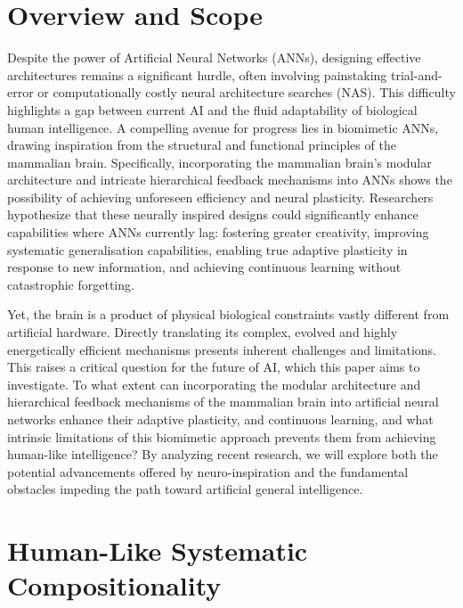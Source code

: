 \documentclass[
10pt, %
a4paper, %
oneside, %
headinclude,footinclude, %
BCOR5mm, %
]{scrartcl}
\begin{document}
\section{Overview and Scope}

Despite the power of Artificial Neural Networks (ANNs), designing effective architectures remains a significant hurdle, often involving painstaking trial-and-error or computationally costly neural architecture searches (NAS). This difficulty highlights a gap between current AI and the fluid adaptability of biological human intelligence. A compelling avenue for progress lies in biomimetic ANNs, drawing inspiration from the structural and functional principles of the mammalian brain. Specifically, incorporating the mammalian brain's modular architecture and intricate hierarchical feedback mechanisms into ANNs shows the possibility of achieving unforeseen efficiency and neural plasticity. Researchers hypothesize that these neurally inspired designs could significantly enhance capabilities where ANNs currently lag: fostering greater creativity, improving systematic generalisation capabilities, enabling true adaptive plasticity in response to new information, and achieving continuous learning without catastrophic forgetting.

Yet, the brain is a product of physical biological constraints vastly different from artificial hardware. Directly translating its complex, evolved and highly energetically efficient mechanisms presents inherent challenges and limitations. This raises a critical question for the future of AI, which this paper aims to investigate. To what extent can incorporating the modular architecture and hierarchical feedback mechanisms of the mammalian brain into artificial neural networks enhance their adaptive plasticity, and continuous learning, and what intrinsic limitations of this biomimetic approach prevents them from achieving human-like intelligence? By analyzing recent research, we will explore both the potential advancements offered by neuro-inspiration and the fundamental obstacles impeding the path toward artificial general intelligence.


\section{Human-Like Systematic Compositionality}
\end{document}
